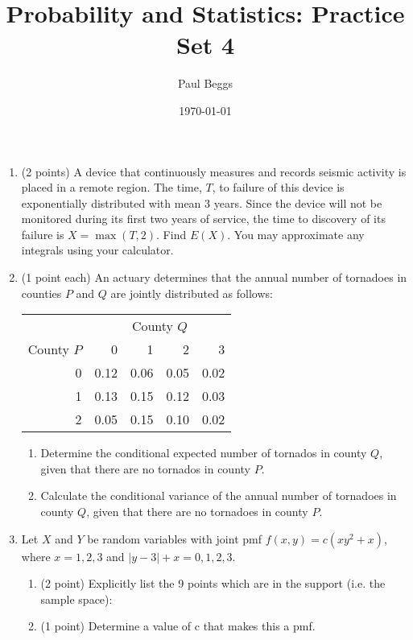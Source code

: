 \documentclass[11pt]{article}
\title{Probability and Statistics: Practice Set 4}
\author{Paul Beggs}
\date{\today}
\newenvironment{solution}
  {\textit{Solution.}}
\newcommand{\sol}[1]{
    \begin{customframedproof}[linecolor=orangehdx!75,]
        \begin{solution}
        #1
        \end{solution}
    \end{customframedproof}
}
\begin{document}
\maketitle

\begin{enumerate}
    \item (2 points) A device that continuously measures and records seismic activity is placed in a remote region. The time, \(T\), to failure of this device is exponentially distributed with mean 3 years. Since the device will not be monitored during its first two years of service, the time to discovery of its failure is \(X = \max(T,2)\). Find \(E(X)\). You may approximate any integrals using your calculator.
    \sol{

    }
    \item (1 point each) An actuary determines that the annual number of tornadoes in counties \(P\) and \(Q\) are jointly distributed as follows: \\
    \begin{tabular}{r||r|r|r|r}
        & \multicolumn{4}{c}{County \(Q\)} \\
        County \(P\) & 0 & 1 & 2 & 3 \\ \hline\hline
        0 & 0.12 & 0.06 & 0.05 & 0.02 \\ 
        1 & 0.13 & 0.15 & 0.12 & 0.03 \\
        2 & 0.05 & 0.15 & 0.10 & 0.02
    \end{tabular}
    \begin{enumerate}
        \item Determine the conditional expected number of tornados in county \(Q\), given that there are no tornados in county \(P\).
        \sol{

        }
        \item Calculate the conditional variance of the annual number of tornadoes in county \(Q\), given that there are no tornadoes in county \(P\).
        \sol{

        }
    \end{enumerate}
    \item Let \(X\) and \(Y\) be random variables with joint pmf \(f(x, y) = c  (xy^2 + x)\), where \(x = 1, 2, 3\) and \(|y - 3| + x = 0, 1, 2, 3\).
    \begin{enumerate}
        \item (2 point) Explicitly list the 9 points which are in the support (i.e. the sample space):
        \sol{

        }
        \item (1 point) Determine a value of c that makes this a pmf.
        \sol{

}
\end{enumerate}
\end{enumerate}
\end{document}
